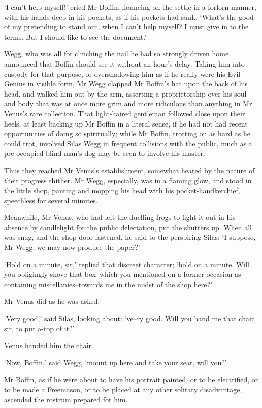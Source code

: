‘I can’t help myself!’ cried Mr Boffin, flouncing on the settle in a
forlorn manner, with his hands deep in his pockets, as if his pockets
had sunk. ‘What’s the good of my pretending to stand out, when I can’t
help myself? I must give in to the terms. But I should like to see the
document.’

Wegg, who was all for clinching the nail he had so strongly driven home,
announced that Boffin should see it without an hour’s delay. Taking him
into custody for that purpose, or overshadowing him as if he really were
his Evil Genius in visible form, Mr Wegg clapped Mr Boffin’s hat
upon the back of his head, and walked him out by the arm, asserting a
proprietorship over his soul and body that was at once more grim and
more ridiculous than anything in Mr Venus’s rare collection. That
light-haired gentleman followed close upon their heels, at least backing
up Mr Boffin in a literal sense, if he had not had recent opportunities
of doing so spiritually; while Mr Boffin, trotting on as hard as he
could trot, involved Silas Wegg in frequent collisions with the public,
much as a pre-occupied blind man’s dog may be seen to involve his
master.

Thus they reached Mr Venus’s establishment, somewhat heated by the
nature of their progress thither. Mr Wegg, especially, was in a flaming
glow, and stood in the little shop, panting and mopping his head with
his pocket-handkerchief, speechless for several minutes.

Meanwhile, Mr Venus, who had left the duelling frogs to fight it out in
his absence by candlelight for the public delectation, put the shutters
up. When all was snug, and the shop-door fastened, he said to the
perspiring Silas: ‘I suppose, Mr Wegg, we may now produce the paper?’

‘Hold on a minute, sir,’ replied that discreet character; ‘hold on a
minute. Will you obligingly shove that box--which you mentioned on a
former occasion as containing miscellanies--towards me in the midst of
the shop here?’

Mr Venus did as he was asked.

‘Very good,’ said Silas, looking about: ‘ve--ry good. Will you hand me
that chair, sir, to put a-top of it?’

Venus handed him the chair.

‘Now, Boffin,’ said Wegg, ‘mount up here and take your seat, will you?’

Mr Boffin, as if he were about to have his portrait painted, or to be
electrified, or to be made a Freemason, or to be placed at any other
solitary disadvantage, ascended the rostrum prepared for him.

